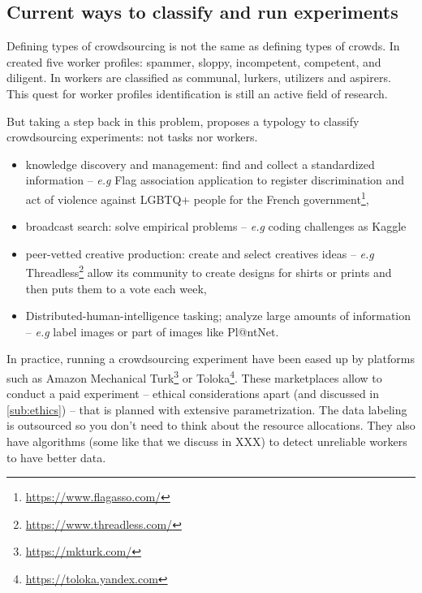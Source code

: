 \subsection{Current ways to classify and run experiments}
\label{sub:run-experiments}

Defining types of crowdsourcing is not the same as defining types of crowds.
In \citet{kazai2011worker} created five worker profiles: spammer, sloppy, incompetent, competent, and diligent. In \citet{martineau2012typology} workers are classified as communal, lurkers, utilizers and aspirers.
This quest for worker profiles identification is still an active field of research.

But taking a step back in this problem, \citet{brabham2013crowdsourcing} proposes a typology to classify crowdsourcing experiments: not tasks nor workers.  
\begin{itemize}
    \item knowledge discovery and management: find and collect a standardized information -- \emph{e.g} Flag association application to register discrimination and act of violence against LGBTQ+ people for the French government\footnote{\url{https://www.flagasso.com/}}, 
    \item broadcast search: solve empirical problems -- \emph{e.g} coding challenges as Kaggle
    \item peer-vetted creative production: create and select creatives ideas -- \emph{e.g} Threadless\footnote{\url{https://www.threadless.com/}} allow its community to create designs for shirts or prints and then puts them to a vote each week,  
    \item Distributed-human-intelligence tasking; analyze large amounts of information -- \emph{e.g} label images or part of images like Pl@ntNet.
\end{itemize}

In practice, running a crowdsourcing experiment have been eased up by platforms such as Amazon Mechanical Turk\footnote{\url{https://mkturk.com/}} or Toloka\footnote{\url{https://toloka.yandex.com}}.
These marketplaces allow to conduct a paid experiment -- ethical considerations apart (and discussed in \cref{sub:ethics}) -- that is planned with extensive parametrization.
The data labeling is outsourced so you don't need to think about the resource allocations. They also have algorithms (some like \citet{raykar_ranking_2011} that we discuss in XXX) to detect unreliable workers to have better data.

